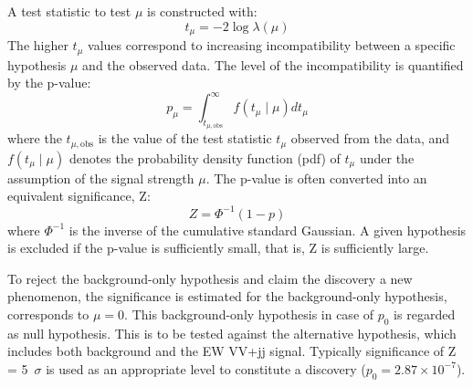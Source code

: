 A test statistic to test $\mu$ is constructed with:
\begin{equation}
t_{\mu}= -2 \log \lambda (\mu)
\end{equation}
The higher $t_{\mu}$ values correspond to increasing incompatibility between a specific hypothesis $\mu$ and the observed data.
The level of the incompatibility is quantified by the p-value:
\begin{equation}
p_{\mu}=\int_{t_{\mu, \mathrm{obs}}}^{\infty} f\left(t_{\mu} \mid \mu\right) d t_{\mu}
\end{equation}
where the $t_{\mu, \mathrm{obs}}$ is the value of the test statistic $t_{\mu}$ observed from the data, and $f\left(t_{\mu} \mid \mu\right)$ denotes the probability density function (pdf) of $t_{\mu}$ under the assumption of the signal strength $\mu$.
%
The p-value is often converted into an equivalent significance, Z:
\begin{equation}
Z=\Phi^{-1}(1-p)
\end{equation}
where $\Phi^{-1}$ is the inverse of the cumulative standard Gaussian.
A given hypothesis is excluded if the p-value is sufficiently small, that is, Z is sufficiently large.

To reject the background-only hypothesis and claim the discovery a new phenomenon, the significance is estimated for the background-only hypothesis, corresponds to $\mu = 0$.
This background-only hypothesis in case of $p_0$ is regarded as null hypothesis. 
This is to be tested against the alternative hypothesis, which includes both background and the EW VV+jj signal.
Typically significance of Z = 5~$\sigma$ is used as an appropriate level to constitute a discovery ($p_0 = 2.87 \times 10^{-7}$). 


